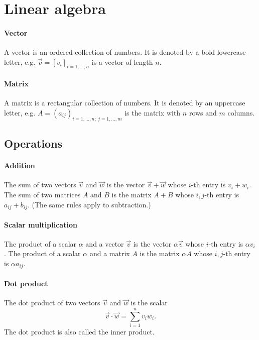 \section{Linear algebra}

\paragraph{Vector}  A vector is an ordered collection of numbers.  It is denoted by a bold
lowercase letter, e.g. $\vec{v} = [v_i]_{i= 1,\dots, n}$ is a vector of length $n$.

\paragraph{Matrix}  A matrix is a rectangular collection of numbers.  It is denoted by an
uppercase letter, e.g. $A = (a_{ij})_{i = 1, \dots, n;~j = 1, \dots, m}$ is the matrix
with $n$ rows and $m$ columns.

\subsection{Operations}

\paragraph{Addition}  The sum of two vectors $\vec{v}$ and $\vec{w}$ is the vector
$\vec{v} + \vec{w}$ whose $i$-th entry is $v_i + w_i$.  The sum of two matrices $A$ and
$B$ is the matrix $A + B$ whose $i, j$-th entry is $a_{ij} + b_{ij}$.  (The same rules apply
to subtraction.)

\paragraph{Scalar multiplication}  The product of a scalar $\alpha$ and a vector $\vec{v}$
is the vector $\alpha \vec{v}$ whose $i$-th entry is $\alpha v_i$.  The product of a
scalar $\alpha$ and a matrix $A$ is the matrix $\alpha A$ whose $i, j$-th entry is
$\alpha a_{ij}$.

\paragraph{Dot product}  The dot product of two vectors $\vec{v}$ and $\vec{w}$ is the
scalar $$\vec{v} \cdot \vec{w} = \sum_{i = 1}^n v_i w_i\text{.}$$  The dot product is also called
the inner product.

